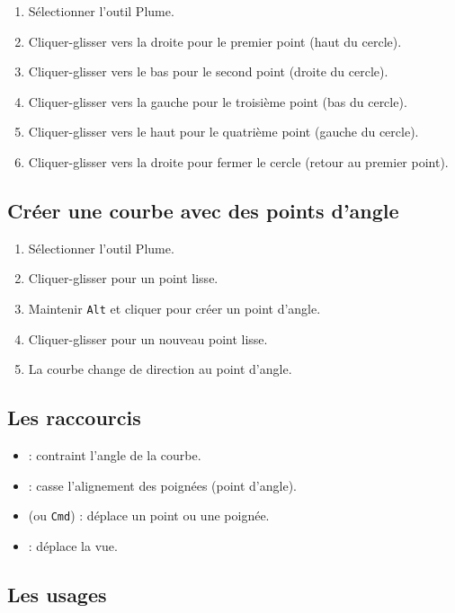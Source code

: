 \begin{enumerate}
    \item Sélectionner l'outil Plume.
    \item Cliquer-glisser vers la droite pour le premier point (haut du cercle).
    \item Cliquer-glisser vers le bas pour le second point (droite du cercle).
    \item Cliquer-glisser vers la gauche pour le troisième point (bas du cercle).
    \item Cliquer-glisser vers le haut pour le quatrième point (gauche du cercle).
    \item Cliquer-glisser vers la droite pour fermer le cercle (retour au premier point).
\end{enumerate}

\subsection{Créer une courbe avec des points d'angle}

\begin{enumerate}
    \item Sélectionner l'outil Plume.
    \item Cliquer-glisser pour un point lisse.
    \item Maintenir \texttt{Alt} et cliquer pour créer un point d'angle.
    \item Cliquer-glisser pour un nouveau point lisse.
    \item La courbe change de direction au point d'angle.
\end{enumerate}

\subsection{Les raccourcis}

\begin{itemize}
    \item {} : contraint l'angle de la courbe.
    \item {} : casse l'alignement des poignées (point d'angle).
    \item {} (ou \texttt{Cmd}) : déplace un point ou une poignée.
    \item {} : déplace la vue.
\end{itemize}

\subsection{Les usages}


